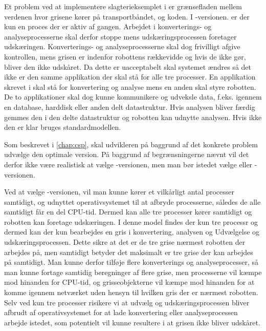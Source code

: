 Et problem ved at implementere slagterieksemplet i \pycsp er  grænsefladen mellem verdenen hvor grisene kører på transportbåndet, og  koden. I -versionen.   er der kun  en proces  der er aktiv af gangen. Arbejdet i  konverterings- og analyseprocesserne skal derfor stoppe  mens  udskæringsprocessen foretager udskæringen.  Konverterings- og analyseprocesserne  skal dog frivilligt afgive kontrollen, mens grisen er indenfor robottens rækkevidde og hvis de ikke gør, bliver den ikke udskåret. Da dette er uacceptabelt skal systemet ændres så det ikke er den samme applikation der skal stå for alle tre processer. En applikation skrevet i \pycsp skal stå for konvertering og analyse mens en anden skal styre robotten. De to applikationer skal dog kunne kommunikere og  udveksle data, f.eks. igennem en database, harddisk eller anden delt datastruktur. Hvis analysen bliver færdig gemmes den i den delte datastruktur og robotten kan udnytte analysen. Hvis ikke den er klar bruges standardmodellen.    

Som beskrevet i \autoref{chap:csp}, skal udvikleren på baggrund af det konkrete problem  udvælge den optimale \pycsp version. På baggrund af begrænsningerne nævnt vil det derfor ikke være realistisk at vælge -versionen, men man bør istedet vælge  eller -versionen.

Ved at vælge -versionen, vil man kunne kører et vilkårligt antal processer samtidigt, og udnyttet operativsystemet til at afbryde processerne, således de alle samtidigt får en del CPU-tid. Dermed kan alle tre processer kører samtidigt og robotten kan foretage udskæringen. I denne model findes der kun tre processr og dermed kan der kun bearbejdes en gris i konvertering, analysen og Udvælgelse og udskæringsprocessen. Dette sikre at det er de tre  grise nærmest robotten der arbejdes på, men samtidigt betyder det maksimalt er tre grise der kan arbejdes på samtidigt. Man kunne derfor tilføje flere konverterings og analyseprocesser, så man kunne fortage samtidig beregninger af flere grise, men processerne vil kæmpe mod hinanden for CPU-tid, og grisseobjekterne vil kæmpe mod hinanden for at komme igennem netværket uden hensyn til hvilken gris der er nærmest robotten. Selv ved kun tre  processer risikere vi at udvælg og udskæringsprocessen bliver afbrudt af operativsystemet for at lade konvertering eller analyseprocessen arbejde istedet, som potentielt vil kunne resultere i at grisen ikke bliver udskåret.

